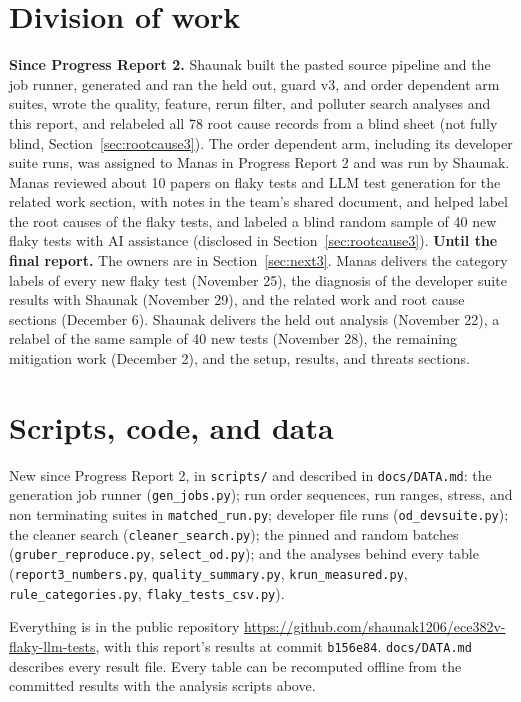 \documentclass[sigconf,nonacm]{acmart}
\begin{document}
\section{Division of work}
\textbf{Since Progress Report 2.} Shaunak built the pasted source pipeline and the job runner, generated and ran the held out, guard v3, and order dependent arm suites, wrote the quality, feature, rerun filter, and polluter search analyses and this report, and relabeled all 78 root cause records from a blind sheet (not fully blind, Section~\ref{sec:rootcause3}). The order dependent arm, including its developer suite runs, was assigned to Manas in Progress Report 2 and was run by Shaunak. Manas reviewed about 10 papers on flaky tests and LLM test generation for the related work section, with notes in the team's shared document, and helped label the root causes of the flaky tests, and labeled a blind random sample of 40 new flaky tests with AI assistance (disclosed in Section~\ref{sec:rootcause3}). \textbf{Until the final report.} The owners are in Section~\ref{sec:next3}. Manas delivers the category labels of every new flaky test (November 25), the diagnosis of the developer suite results with Shaunak (November 29), and the related work and root cause sections (December 6). Shaunak delivers the held out analysis (November 22), a relabel of the same sample of 40 new tests (November 28), the remaining mitigation work (December 2), and the setup, results, and threats sections.

\section{Scripts, code, and data}
\label{sec:code}
{\raggedright New since Progress Report 2, in \texttt{scripts/} and described in \texttt{docs/DATA.md}: the generation job runner (\texttt{gen\_jobs.py}); run order sequences, run ranges, stress, and non terminating suites in \texttt{matched\_run.py}; developer file runs (\texttt{od\_devsuite.py}); the cleaner search (\texttt{cleaner\_search.py}); the pinned and random batches (\texttt{gruber\_reproduce.py}, \texttt{select\_od.py}); and the analyses behind every table (\texttt{report3\_numbers.py}, \texttt{quality\_summary.py}, \texttt{krun\_measured.py}, \texttt{rule\_categories.py}, \texttt{flaky\_tests\_csv.py}).\par}

{\raggedright Everything is in the public repository \url{https://github.com/shaunak1206/ece382v-flaky-llm-tests}, with this report's results at commit \texttt{b156e84}. \texttt{docs/DATA.md} describes every result file. Every table can be recomputed offline from the committed results with the analysis scripts above.\par}



\end{document}
